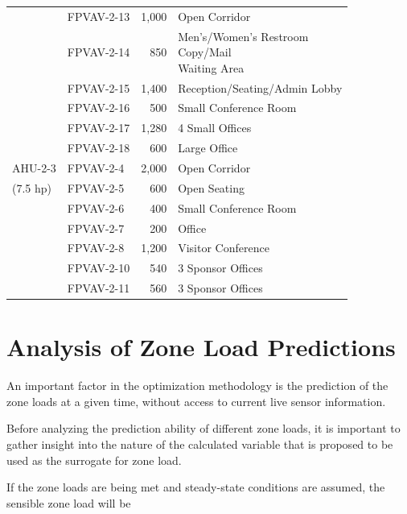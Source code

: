 \begin{table}[]
\begin{tabular}{@{}llrl@{}}
               & FPVAV-2-13 & 1,000 & Open Corridor \\  \cmidrule(r){2-4}
               & FPVAV-2-14 & 850 & \pbox{\textwidth}{Men's/Women's Restroom \\ Copy/Mail \\ Waiting Area }\\  \cmidrule(r){2-4}
               & FPVAV-2-15 & 1,400 & Reception/Seating/Admin Lobby \\  \cmidrule(r){2-4}
               & FPVAV-2-16 & 500 & Small Conference Room \\  \cmidrule(r){2-4}
               & FPVAV-2-17 & 1,280 & 4 Small Offices \\  \cmidrule(r){2-4}
               & FPVAV-2-18 & 600 & Large Office \\\midrule
AHU-2-3  & FPVAV-2-4 & 2,000 & Open Corridor \\  \cmidrule(r){2-4}
        (7.5 hp)       & FPVAV-2-5 & 600 & Open Seating \\  \cmidrule(r){2-4}
               & FPVAV-2-6 & 400 & Small Conference Room \\  \cmidrule(r){2-4}
               & FPVAV-2-7 & 200 & Office \\  \cmidrule(r){2-4}
               & FPVAV-2-8 & 1,200 & Visitor Conference \\  \cmidrule(r){2-4}
               & FPVAV-2-10 & 540 & 3 Sponsor Offices \\  \cmidrule(r){2-4}
               & FPVAV-2-11 & 560 & 3 Sponsor Offices \\ \bottomrule
\end{tabular}
\end{table}


\section{Analysis of Zone Load Predictions}

An important factor in the optimization methodology is the prediction of the zone loads at a given time, without access to current live sensor information. 

Before analyzing the prediction ability of different zone loads, it is important to gather insight into the nature of the calculated variable that is proposed to be used as the surrogate for zone load.   

If the zone loads are being met and steady-state conditions are assumed, the sensible zone load will be

